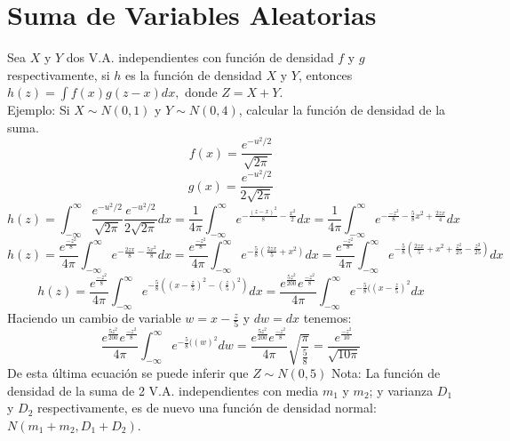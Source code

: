 \documentclass[11pt,fleqn]{book} %
\numberwithin{equation}{section} %
\numberwithin{figure}{section} %
\numberwithin{table}{section} %
\begin{document}
\section{Suma de Variables Aleatorias}
Sea $X$ y $Y$ dos V.A. independientes con función de densidad $f$ y $g$ respectivamente, si $h$ es la función de densidad $X$ y $Y$, entonces
$h(z)=\int f(x)g(z-x) dx,$ donde $Z=X+Y$.
\ \\%
Ejemplo: Si $X \sim N(0,1)$ y $Y \sim N(0,4)$, calcular la función de densidad de la suma.
$$f(x)= \frac{ e^{-u^2/2}}{\sqrt{2\pi}}$$
$$g(x)= \frac{ e^{-u^2/2}}{2\sqrt{2\pi}}$$ 
$$h(z)=\int_{-\infty}^{\infty} \frac{ e^{-u^2/2}}{\sqrt{2\pi}}\frac{ e^{-u^2/2}}{2\sqrt{2\pi}} dx = \frac{1}{4\pi}\int_{ -\infty }^{ \infty}e^{-\frac{(z-x)^2}{8}-\frac{x^2}{2}}dx = \frac{1}{4\pi}\int_{ -\infty }^{ \infty}e^{-\frac{-z^2}{8}-\frac{5}{8}x^2+\frac{2zx}{4}}dx$$ 
$$h(z)= \frac{e^{\frac{-z^2}{8}}}{4\pi}\int_{ -\infty }^{ \infty}e^{-\frac{2zx}{8}-\frac{5x^2}{8}}dx = \frac{e^{\frac{-z^2}{8}}}{4\pi}\int_{ -\infty }^{ \infty}e^{-\frac{5}{8}(\frac{2zx}{5}+x^2)}dx = \frac{e^{\frac{-z^2}{8}}}{4\pi}\int_{ -\infty }^{ \infty}e^{-\frac{5}{8}(\frac{2zx}{5}+x^2+\frac{z^2}{25}-\frac{z^2}{25})}dx$$
$$h(z)= \frac{e^{\frac{-z^2}{8}}}{4\pi}\int_{ -\infty }^{ \infty}e^{-\frac{5}{8}((x-\frac{z}{5})^2-(\frac{z}{5})^2)} dx = \frac{e^{\frac{5z^2}{200}}e^{\frac{-z^2}{8}}}{4\pi}\int_{ -\infty }^{ \infty}e^{-\frac{5}{8}((x-\frac{z}{5})^2} dx$$
Haciendo un cambio de variable $w=x-\frac{z}{5}$ y $dw=dx$ tenemos:
$$\frac{e^{\frac{5z^2}{200}}e^{\frac{-z^2}{8}}}{4\pi}\int_{ -\infty }^{ \infty}e^{-\frac{5}{8}((w)^2} dw = \frac{e^{\frac{5z^2}{200}}e^{\frac{-z^2}{8}}}{4\pi} \sqrt{\frac{\pi}{\frac{5}{8}}}=\frac{e^{\frac{-z^2}{10}}}{\sqrt{10\pi}}$$
De esta última ecuación se puede inferir que $Z \sim N(0,5)$
Nota: La función de densidad de la suma de 2 V.A. independientes con media $m_{1}$ y $m_{2}$; y varianza $D_{1}$ y $D_{2}$ respectivamente, es de nuevo una función de densidad normal: $N(m_{1}+m_{2}, D_{1}+ D_{2})$.
\end{document}

